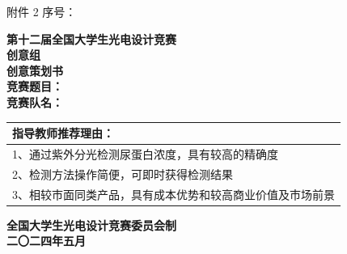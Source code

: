 \documentclass[a4paper,12pt]{article}
\begin{document}
\begin{titlepage}
    \vspace*{1cm}
    \noindent 附件 2 \hfill \Large 序号：\underline{}\\[2.5cm]
    
    \begin{center}
        {\Huge \textbf{第十二届全国大学生光电设计竞赛}}\\[0.8cm]
        {\Huge \textbf{创意组}}\\[2.5cm]
        
        {\fontsize{36pt}{40pt}\selectfont \textbf{创意策划书}}\\[3cm]
        
        {\Large \textbf{竞赛题目：}\underline{}}\\[1cm]
        {\Large \textbf{竞赛队名：}\underline{}}\\[2cm]
    \end{center}
    
    \begin{table}[H]
        \centering
        \renewcommand{\arraystretch}{1.8}
        \begin{tabular}{|p{15cm}|}
        \hline
        \textbf{指导教师推荐理由：} \\
        \hline
        1、通过紫外分光检测尿蛋白浓度，具有较高的精确度 \\
        \hline
        2、检测方法操作简便，可即时获得检测结果 \\
        \hline
        3、相较市面同类产品，具有成本优势和较高商业价值及市场前景 \\
        \hline
        \end{tabular}
    \end{table}
    
    \vfill
    \begin{center}
        {\Large \textbf{全国大学生光电设计竞赛委员会制}}\\[0.5cm]
        {\Large \textbf{二〇二四年五月}}
    \end{center}
\end{titlepage}

\newpage
\end{document}
